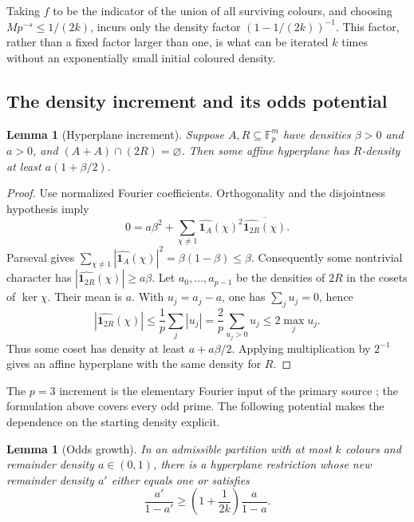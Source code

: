 \documentclass[11pt]{article}
\newtheorem{lemma}[theorem]{Lemma}
\theoremstyle{remark}
\newcommand{\Fp}{\mathbb F_p}
\newcommand{\ind}{\mathbf 1}
\begin{document}
Taking $f$ to be the indicator of the union of all surviving colours, and
choosing $Mp^{-s}\leq1/(2k)$, incurs only the density factor
$(1-1/(2k))^{-1}$. This factor, rather than a fixed factor larger than one,
is what can be iterated $k$ times without an exponentially small initial
coloured density.

\subsection{The density increment and its odds potential}

\begin{lemma}[Hyperplane increment]\label{lem:increment}
Suppose $A,R\subseteq\Fp^m$ have densities $\beta>0$ and $a>0$, and
$(A+A)\cap(2R)=\varnothing$. Then some affine hyperplane has $R$-density
at least $a(1+\beta/2)$.
\end{lemma}

\begin{proof}
Use normalized Fourier coefficients. Orthogonality and the disjointness
hypothesis imply
\[
 0=a\beta^2+
 \sum_{\chi\ne1}\widehat{\ind_A}(\chi)^2
                  \overline{\widehat{\ind_{2R}}(\chi)}.
\]
Parseval gives
$\sum_{\chi\ne1}|\widehat{\ind_A}(\chi)|^2=\beta(1-\beta)\leq\beta$.
Consequently some nontrivial character has
$|\widehat{\ind_{2R}}(\chi)|\geq a\beta$.
Let $a_0,\ldots,a_{p-1}$ be the densities of $2R$ in the cosets of
$\ker\chi$. Their mean is $a$. With $u_j=a_j-a$, one has
$\sum_j u_j=0$, hence
\[
 |\widehat{\ind_{2R}}(\chi)|
 \leq\frac1p\sum_j|u_j|
 =\frac2p\sum_{u_j>0}u_j
 \leq2\max_j u_j.
\]
Thus some coset has density at least $a+a\beta/2$.
Applying multiplication by $2^{-1}$ gives an affine hyperplane with the
same density for $R$.
\end{proof}

The $p=3$ increment is the elementary Fourier input of the primary source
\cite{midpoint}; the formulation above covers every odd prime. The
following potential makes the dependence on the starting density explicit.

\begin{lemma}[Odds growth]\label{lem:odds}
In an admissible partition with at most $k$ colours and remainder density
$a\in(0,1)$, there is a hyperplane restriction whose new remainder density
$a'$ either equals one or satisfies
\begin{equation}\label{eq:odds}
 \frac{a'}{1-a'}\geq
 \left(1+\frac1{2k}\right)\frac{a}{1-a}.
\end{equation}
\end{lemma}
\end{document}
